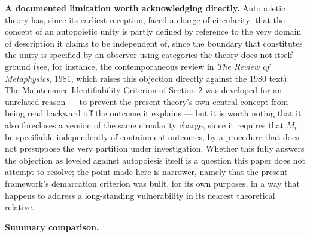 \documentclass[11pt]{article}
\theoremstyle{plain}
\begin{document}
\textbf{A documented limitation worth acknowledging directly.} Autopoietic theory has, since its earliest reception, faced a charge of circularity: that the concept of an autopoietic unity is partly defined by reference to the very domain of description it claims to be independent of, since the boundary that constitutes the unity is specified by an observer using categories the theory does not itself ground (see, for instance, the contemporaneous review in \emph{The Review of Metaphysics}, 1981, which raises this objection directly against the 1980 text). The Maintenance Identifiability Criterion of Section 2 was developed for an unrelated reason --- to prevent the present theory's own central concept from being read backward off the outcome it explains --- but it is worth noting that it also forecloses a version of the same circularity charge, since it requires that \(M_t\) be specifiable independently of containment outcomes, by a procedure that does not presuppose the very partition under investigation. Whether this fully answers the objection as leveled against autopoiesis itself is a question this paper does not attempt to resolve; the point made here is narrower, namely that the present framework's demarcation criterion was built, for its own purposes, in a way that happens to address a long-standing vulnerability in its nearest theoretical relative.

\textbf{Summary comparison.}
\end{document}
